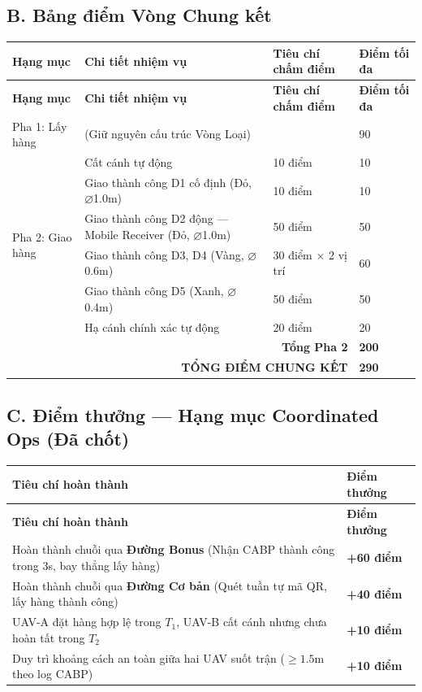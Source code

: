 \documentclass[12pt,a4paper]{article}
\begin{document}
\subsection*{B. Bảng điểm Vòng Chung kết}
\begin{longtable}{p{3.0cm}p{6.0cm}p{3.8cm}p{1.6cm}}
\toprule
\textbf{Hạng mục} & \textbf{Chi tiết nhiệm vụ} & \textbf{Tiêu chí chấm điểm} & \textbf{Điểm tối đa} \\
\midrule
\endfirsthead
\toprule
\textbf{Hạng mục} & \textbf{Chi tiết nhiệm vụ} & \textbf{Tiêu chí chấm điểm} & \textbf{Điểm tối đa} \\
\midrule
\endhead
Pha 1: Lấy hàng & (Giữ nguyên cấu trúc Vòng Loại) & & 90 \\
\midrule
\multirow{6}{3.0cm}{Pha 2: Giao hàng} & Cất cánh tự động & 10 điểm & 10 \\
 & Giao thành công D1 cố định (Đỏ, $\varnothing$1.0m) & 10 điểm & 10 \\
 & Giao thành công D2 động — Mobile Receiver (Đỏ, $\varnothing$1.0m) & 50 điểm & 50 \\
 & Giao thành công D3, D4 (Vàng, $\varnothing$0.6m) & 30 điểm $\times$ 2 vị trí & 60 \\
 & Giao thành công D5 (Xanh, $\varnothing$0.4m) & 50 điểm & 50 \\
 & Hạ cánh chính xác tự động & 20 điểm & 20 \\
\midrule
\multicolumn{3}{r}{\textbf{Tổng Pha 2}} & \textbf{200} \\
\midrule
\multicolumn{3}{r}{\textbf{TỔNG ĐIỂM CHUNG KẾT}} & \textbf{290} \\
\bottomrule
\end{longtable}

\subsection*{C. Điểm thưởng — Hạng mục Coordinated Ops (Đã chốt)}
\begin{longtable}{p{10.5cm}p{3.5cm}}
\toprule
\textbf{Tiêu chí hoàn thành} & \textbf{Điểm thưởng} \\
\midrule
\endfirsthead
\toprule
\textbf{Tiêu chí hoàn thành} & \textbf{Điểm thưởng} \\
\midrule
\endhead
Hoàn thành chuỗi qua \textbf{Đường Bonus} (Nhận CABP thành công trong 3s, bay thẳng lấy hàng) & \textbf{+60 điểm} \\
Hoàn thành chuỗi qua \textbf{Đường Cơ bản} (Quét tuần tự mã QR, lấy hàng thành công) & \textbf{+40 điểm} \\
UAV-A đặt hàng hợp lệ trong $T_1$, UAV-B cất cánh nhưng chưa hoàn tất trong $T_2$ & \textbf{+10 điểm} \\
Duy trì khoảng cách an toàn giữa hai UAV suốt trận ($\ge 1.5$m theo log CABP) & \textbf{+10 điểm} \\
\bottomrule
\end{longtable}
\end{document}
